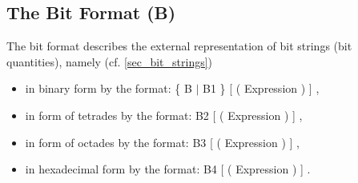 \subsection{The Bit Format (B)}    %
\label{sec_dation_b_format}



The bit format describes the external representation of bit strings (bit
quantities), namely (cf. \ref{sec_bit_strings})
\begin{itemize}
\item in binary form by the format: \{ B $\mid$ B1 \} [ ( Expression ) ] ,
\item in form of tetrades by the format: B2 [ ( Expression ) ] ,
\item in form of octades by the format: B3 [ ( Expression ) ] ,
\item in hexadecimal form by the format: B4 [ ( Expression ) ] .
\end{itemize}

